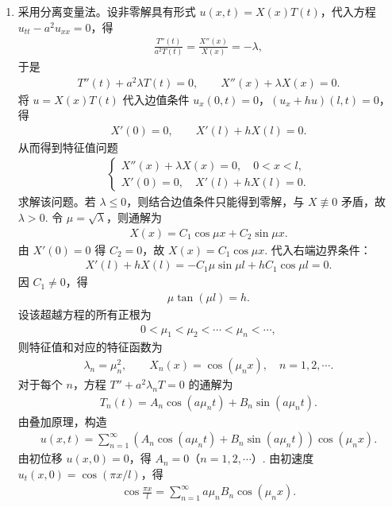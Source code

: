 \documentclass[../../main.tex]{subfiles}%
\begin{document}
\begin{solution}
\begin{enumerate}[(1)]
\item 采用分离变量法。设非零解具有形式 $u(x,t)=X(x)T(t)$，代入方程 $u_{tt}-a^2u_{xx}=0$，得
\begin{align*}
\frac{T''(t)}{a^2T(t)}=\frac{X''(x)}{X(x)}=-\lambda,
\end{align*}
于是
\begin{align*}
T''(t)+a^2\lambda T(t)=0,\qquad X''(x)+\lambda X(x)=0.
\end{align*}
将 $u=X(x)T(t)$ 代入边值条件 $u_x(0,t)=0$，$(u_x+hu)(l,t)=0$，得
\begin{align*}
X'(0)=0,\qquad X'(l)+hX(l)=0.
\end{align*}
从而得到特征值问题
\begin{align*}
\begin{cases}
X''(x)+\lambda X(x)=0,\quad 0<x<l,\\
X'(0)=0,\quad X'(l)+hX(l)=0.
\end{cases}
\end{align*}
求解该问题。若 $\lambda\leqslant 0$，则结合边值条件只能得到零解，与 $X\not\equiv 0$ 矛盾，故 $\lambda>0$. 令 $\mu=\sqrt{\lambda}$，则通解为
\begin{align*}
X(x)=C_1\cos \mu x+C_2\sin \mu x.
\end{align*}
由 $X'(0)=0$ 得 $C_2=0$，故 $X(x)=C_1\cos \mu x$.
代入右端边界条件：
\begin{align*}
X'(l)+hX(l)=-C_1\mu\sin \mu l+hC_1\cos \mu l=0.
\end{align*}
因 $C_1\neq 0$，得
\begin{align*}
\mu\tan(\mu l)=h.
\end{align*}
设该超越方程的所有正根为
\begin{align*}
0<\mu_1<\mu_2<\cdots<\mu_n<\cdots,
\end{align*}
则特征值和对应的特征函数为
\begin{align*}
\lambda_n=\mu_n^2,\qquad X_n(x)=\cos(\mu_n x),\quad n=1,2,\cdots.
\end{align*}
对于每个 $n$，方程 $T''+a^2\lambda_n T=0$ 的通解为
\begin{align*}
T_n(t)=A_n\cos(a\mu_n t)+B_n\sin(a\mu_n t).
\end{align*}
由叠加原理，构造
\begin{align*}
u(x,t)=\sum_{n=1}^{\infty}\left(A_n\cos(a\mu_n t)+B_n\sin(a\mu_n t)\right)\cos(\mu_n x).
\end{align*}
由初位移 $u(x,0)=0$，得 $A_n=0$（$n=1,2,\cdots$）.
由初速度 $u_t(x,0)=\cos(\pi x/l)$，得
\begin{align*}
\cos\frac{\pi x}{l}=\sum_{n=1}^{\infty}a\mu_n B_n\cos(\mu_n x).

\end{align*}
\end{enumerate}
\end{solution}
\end{document}

